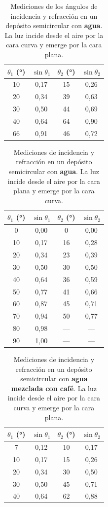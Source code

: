 \documentclass[11pt,twocolumn]{article}
\begin{document}
\begin{table}[H]
\centering
\caption{Mediciones de los ángulos de incidencia y refracción en un depósito semicircular con \textbf{agua}. 
La luz incide desde el aire por la cara curva y emerge por la cara plana.}
\label{tab:agua_curva_plana}
\begin{tabular}{|c|c|c|c|}
\hline
$\theta_{1}$ (°) & $\sin\theta_{1}$ & $\theta_{2}$ (°) & $\sin\theta_{2}$ \\ \hline
10 & 0,17 & 15 & 0,26 \\
20 & 0,34 & 39 & 0,63 \\
30 & 0,50 & 44 & 0,69 \\
40 & 0,64 & 64 & 0,90 \\
66 & 0,91 & 46 & 0,72 \\ \hline
\end{tabular}
\end{table}

\begin{table}[H]
\centering
\caption{Mediciones de incidencia y refracción en un depósito semicircular con \textbf{agua}. 
La luz incide desde el aire por la cara plana y emerge por la cara curva.}
\label{tab:agua_plana_curva}
\begin{tabular}{|c|c|c|c|}
\hline
$\theta_{1}$ (°) & $\sin\theta_{1}$ & $\theta_{2}$ (°) & $\sin\theta_{2}$ \\ \hline
0 & 0,00 & 0 & 0,00 \\
10 & 0,17 & 16 & 0,28 \\
20 & 0,34 & 23 & 0,39 \\
30 & 0,50 & 30 & 0,50 \\
40 & 0,64 & 36 & 0,59 \\
50 & 0,77 & 41 & 0,66 \\
60 & 0,87 & 45 & 0,71 \\
70 & 0,94 & 50 & 0,77 \\
80 & 0,98 & --- & --- \\
90 & 1,00 & --- & --- \\ \hline
\end{tabular}
\end{table}

\begin{table}[H]
\centering
\caption{Mediciones de incidencia y refracción en un depósito semicircular con \textbf{agua mezclada con café}. 
La luz incide desde el aire por la cara curva y emerge por la cara plana.}
\label{tab:cafe_curva_plana}
\begin{tabular}{|c|c|c|c|}
\hline
$\theta_{1}$ (°) & $\sin\theta_{1}$ & $\theta_{2}$ (°) & $\sin\theta_{2}$ \\ \hline
7 & 0,12 & 10 & 0,17 \\
10 & 0,17 & 15 & 0,26 \\
20 & 0,34 & 30 & 0,50 \\
30 & 0,50 & 45 & 0,71 \\
40 & 0,64 & 62 & 0,88 \\ \hline
\end{tabular}
\end{table}
\end{document}
